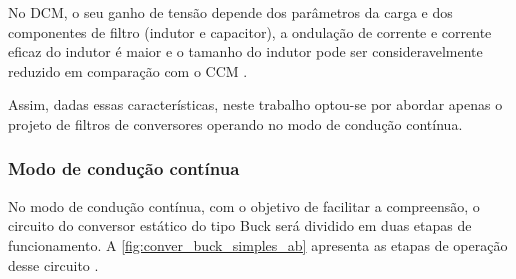             No DCM, o seu ganho de tensão depende dos parâmetros da carga e dos componentes de filtro (indutor e capacitor), a ondulação de corrente e corrente eficaz do indutor é maior e o tamanho do indutor pode ser consideravelmente reduzido em comparação com o CCM \cite{ref:ELP_livro_ConversNIsolado}. 
            
            Assim, dadas essas características, neste trabalho optou-se por abordar apenas o projeto de filtros de conversores operando no modo de condução contínua.
            
            \subsubsection{Modo de condução contínua} \label{cap:fund_elp_convlc_ccm}
            
            No modo de condução contínua, com o objetivo de facilitar a compreensão, o circuito do conversor estático do tipo Buck será dividido em duas etapas de funcionamento. A \autoref{fig:conver_buck_simples_ab} apresenta as etapas de operação desse circuito \cite{ref:ELP_livro_Hart}.
            
